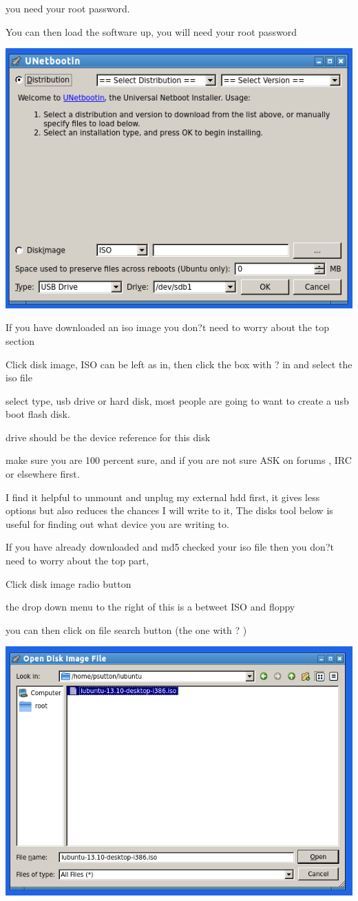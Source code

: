 \documentclass[12pt,a4paper]{book}
\begin{document}
you need your root password.

You can then load the software up, you will need your root password

\newpage




\begin{center}
\includegraphics[width=0.7\linewidth]{unetbootin} 
\end{center}


If you have downloaded an iso image  you don?t need to worry about the top section

Click disk image,  ISO can be left as in,  then click the box with ? in and select the iso file

select type, usb drive or hard disk,  most people are going to want to create a usb boot flash disk.

drive should be the device reference for this disk

make sure you are 100 percent sure,  and if you are not sure ASK on forums , IRC or elsewhere first.

I find it helpful to unmount and unplug my external hdd first,  it gives less options but also reduces the chances I will write to it,  The disks tool below is useful for finding out what device you are writing to.

If you have already downloaded and md5 checked your iso file then you don?t need to worry about the top part,

Click disk image radio button

the drop down menu to the right of this is a betweet ISO and floppy

you can then click on file search button (the one with ? )
\begin{center}
\includegraphics[width=0.7\linewidth]{unetbootin2} 

\end{center}
\end{document}
